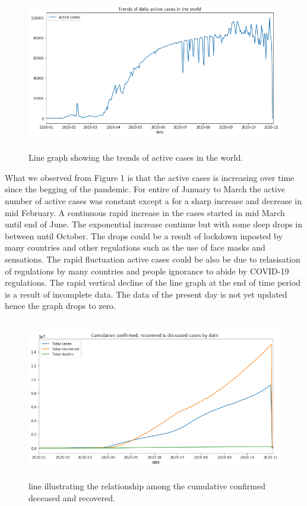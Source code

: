 \documentclass[11pt]{article}
\begin{document}
\begin{figure}[H]
\centering
\includegraphics[width=0.9\linewidth, height=7cm]{activecases.png}
\caption{Line graph showing the trends of active cases in the world.}
\label{fig:figure1}
\end{figure}

What we observed  from Figure 1 is that the active cases is increasing over time since the begging of the pandemic. For entire of January to March the active number of active cases was constant except a for a sharp increase and decrease in mid February. A continuous rapid increase in the cases started in mid March  until end of June. The exponential increase continue but with some deep drops in between until October.  The drops could be a result of lockdown inposted by many countries and other regulations such as the use of face masks and sensations. The  rapid  fluctuation  active cases could be also be due to relasisation of regulations by many countries and people ignorance to abide by COVID-19 regulations. The rapid vertical decline of the line graph at the end of time period is a result of incomplete data. The data of the present day is not yet updated hence the graph drops to zero. 

\begin{figure}[H]
\centering
\includegraphics[width=0.7\linewidth, height=7cm]{line2.png}
\caption{line illustrating the relationship among the cumulative confirmed deceased and recovered.}
\label{fig:figure2}
\end{figure}
\end{document}
